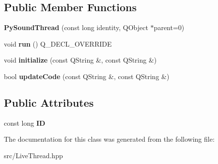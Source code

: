 \subsection*{Public Member Functions}
\begin{DoxyCompactItemize}
\item 
\hypertarget{classPySoundThread_a6243cc4a5d70c97513a1f1e7683347a8}{{\bfseries Py\+Sound\+Thread} (const long identity, Q\+Object $\ast$parent=0)}\label{classPySoundThread_a6243cc4a5d70c97513a1f1e7683347a8}

\item 
\hypertarget{classPySoundThread_afc271219d486efb5557ece0bd5052121}{void {\bfseries run} () Q\+\_\+\+D\+E\+C\+L\+\_\+\+O\+V\+E\+R\+R\+I\+D\+E}\label{classPySoundThread_afc271219d486efb5557ece0bd5052121}

\item 
\hypertarget{classPySoundThread_aa219cc232ef741f992a2ef7ad4a16f88}{void {\bfseries initialize} (const Q\+String \&, const Q\+String \&)}\label{classPySoundThread_aa219cc232ef741f992a2ef7ad4a16f88}

\item 
\hypertarget{classPySoundThread_a90c17718086b36592bc16d005d651390}{bool {\bfseries update\+Code} (const Q\+String \&, const Q\+String \&)}\label{classPySoundThread_a90c17718086b36592bc16d005d651390}

\end{DoxyCompactItemize}
\subsection*{Public Attributes}
\begin{DoxyCompactItemize}
\item 
\hypertarget{classLiveThread_a5cfdefd7574fb1f34bbe1d21b5e3c1d8}{const long {\bfseries I\+D}}\label{classLiveThread_a5cfdefd7574fb1f34bbe1d21b5e3c1d8}

\end{DoxyCompactItemize}


The documentation for this class was generated from the following file\+:\begin{DoxyCompactItemize}
\item 
src/Live\+Thread.\+hpp\end{DoxyCompactItemize}
